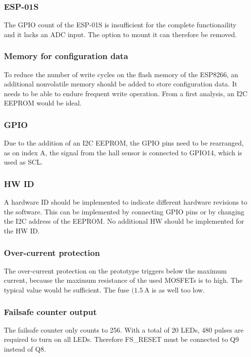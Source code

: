 \subsubsection{ESP-01S}
The GPIO count of the ESP-01S is insufficient for the complete functionaility and it lacks an \ac{ADC} input. The option to mount it can therefore be removed. 

\subsubsection{Memory for configuration data}
To reduce the number of write cycles on the flash memory of the ESP8266, an additional nonvolatile memory should be added to store configuration data. It needs to be able to endure frequent write operation. From a first analysis, an \ac{I2C} \ac{EEPROM} would be ideal. 

\subsubsection{GPIO}
Due to the addition of an \ac{I2C} \ac{EEPROM}, the \ac{GPIO} pins need to be rearranged, as on index A, the signal from the hall sensor is connected to GPIO14, which is used as SCL. 

\subsubsection{HW ID}
A hardware ID should be implemented to indicate different hardware revisions to the software. This can be implemented by connecting GPIO pins or by changing the I2C address of the EEPROM. No additional HW should be implemented for the HW ID. 

\subsubsection{Over-current protection}
The over-current protection on the prototype triggers below the maximum current, because the maximum resistance of the used MOSFETs is to high. The typical value would be sufficient. The fuse $(\qty{1.5}{\A}$ is as well too low. 

\subsubsection{Failsafe counter output}
The failsafe counter only counts to 256. With a total of 20 \acp{LED}, 480 pulses are required to turn on all \acp{LED}. Therefore FS\_RESET must be connected to Q9 instead of Q8. 

